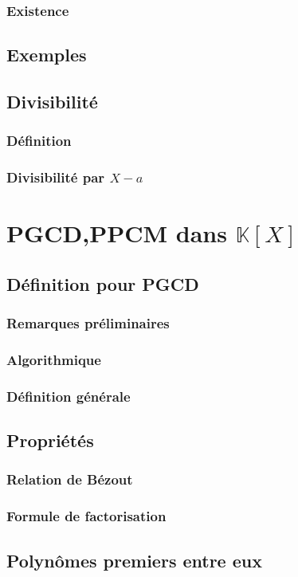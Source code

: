 \documentclass[12pt,a4paper,french]{book}
\begin{document}
			\subsubsection{Existence}
		\subsection{Exemples}
		\subsection{Divisibilité}
			\subsubsection{Définition}
			\subsubsection{Divisibilité par $X-a$}
	\section{PGCD,PPCM dans $\mathbb{K}[X]$}
		\subsection{Définition pour PGCD}
			\subsubsection{Remarques préliminaires}
			\subsubsection{Algorithmique}
			\subsubsection{Définition générale}
		\subsection{Propriétés}
			\subsubsection{Relation de Bézout}
			\subsubsection{Formule de factorisation}
		\subsection{Polynômes premiers entre eux}
\end{document}
